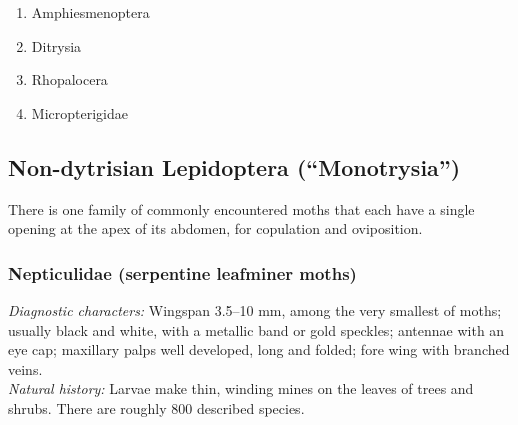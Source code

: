 \documentclass[letterpaper, 11pt]{article}
\begin{document}
\begin{enumerate} 
\item Amphiesmenoptera
\item Ditrysia
\item Rhopalocera
\item Micropterigidae
\end{enumerate}

\subsection{Non-dytrisian Lepidoptera (``Monotrysia'')}
There is one family of commonly encountered moths that each have a single opening at the apex of its abdomen, for copulation and oviposition.

\subsubsection{Nepticulidae (serpentine leafminer moths)}
\noindent{}\textit{Diagnostic characters:} Wingspan 3.5--10 mm, among the very smallest of moths; usually black and white, with a metallic band or gold speckles; antennae with an eye cap; maxillary palps well developed, long and folded; fore wing with branched veins.\\

\noindent{}\textit{Natural history:} Larvae make thin, winding mines on the leaves of trees and shrubs. There are roughly 800 described species.
\end{document}
